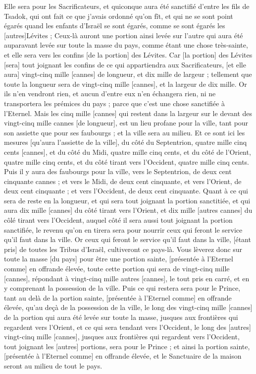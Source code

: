 \begin{multicols}{2}
Elle sera pour les Sacrificateurs, et quiconque aura été sanctifié d'entre les fils de Tsadok, qui ont fait ce que j'avais ordonné qu'on fît, et qui ne se sont point égarés quand les enfants d'Israël se sont égarés, comme se sont égarés les [autres]Lévites ;
Ceux-là auront une portion ainsi levée sur l'autre qui aura été auparavant levée sur toute la masse du pays, comme étant une chose très-sainte, et elle sera vers les confins [de la portion] des Lévites.
Car [la portion] des Lévites [sera] tout joignant les confins de ce qui appartiendra aux Sacrificateurs, [et elle aura] vingt-cinq mille [cannes] de longueur, et dix mille de largeur ; tellement que toute la longueur sera de vingt-cinq mille [cannes], et la largeur de dix mille.
Or ils n'en vendront rien, et aucun d'entre eux n'en échangera rien, ni ne transportera les prémices du pays ; parce que c'est une chose sanctifiée à l'Eternel.
Mais les cinq mille [cannes] qui restent dans la largeur sur le devant des vingt-cinq mille cannes [de longueur], est un lieu profane pour la ville, tant pour son assiette que pour ses faubourgs ; et la ville sera au milieu.
Et ce sont ici les mesures [qu'aura l'assiette de la ville], du côté du Septentrion, quatre mille cinq cents [cannes], et du côté du Midi, quatre mille cinq cents, et du côté de l'Orient, quatre mille cinq cents, et du côté tirant vers l'Occident, quatre mille cinq cents.
Puis il y aura des faubourgs pour la ville, vers le Septentrion, de deux cent cinquante cannes ; et vers le Midi, de deux cent cinquante, et vers l'Orient, de deux cent cinquante ; et vers l'Occident, de deux cent cinquante.
Quant à ce qui sera de reste en la longueur, et qui sera tout joignant la portion sanctitiée, et qui aura dix mille [cannes] du côté tirant vers l'Orient, et dix mille [autres cannes] du côlé tirant vers l'Occident, auquel côté il sera aussi tout joignant la portion sanctifiée, le revenu qu'on en tirera sera pour nourrir ceux qui feront le service qu'il faut dans la ville.
Or ceux qui feront le service qu'il faut dans la ville, [étant pris] de toutes les Tribus d'Israël, cultiveront ce pays-là.
Vous lèverez donc sur toute la masse [du pays] pour être une portion sainte, [présentée à l'Eternel comme] en offrande élevée, toute cette portion qui sera de vingt-cinq mille [cannes], répondant à vingt-cinq mille autres [cannes], le tout pris en carré, et en y comprenant la possession de la ville.
Puis ce qui restera sera pour le Prince, tant au delà de la portion sainte, [présentée à l'Eternel comme] en offrande élevée, qu'au deçà de la possession de la ville, le long des vingt-cinq mille [cannes] de la portion qui aura été levée sur toute la masse, jusques aux frontières qui regardent vers l'Orient, et ce qui sera tendant vers l'Occident, le long des [autres] vingt-cinq mille [cannes], jusques aux frontières qui regardent vers l'Occident, tout joignant les [autres] portions, sera pour le Prince ; et ainsi la portion sainte, [présentée à l'Eternel comme] en offrande élevée, et le Sanctuaire de la maison seront au milieu de tout le pays.

\end{multicols}
